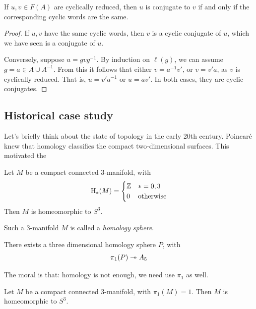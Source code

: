\documentclass{article}
\begin{document}
\begin{lemma}
     If \(u, v \in F(A)\) are cyclically reduced, then \(u\) is conjugate to \(v\) if and only if the corresponding cyclic words are the same.
\end{lemma}

\begin{proof}
    If \(u, v\) have the same cyclic words, then \(v\) is a cyclic conjugate of \(u\), which we have seen is a conjugate of \(u\).

    Conversely, suppose \(u = gvg^{-1}\). By induction on \(\ell(g)\), we can assume \(g = a \in A \cup A^{-1}\). From this it follows that either \(v = a^{-1}v'\), or \(v = v'a\), as \(v\) is cyclically reduced. That is, \(u = v'a^{-1}\) or \(u = av'\). In both cases, they are cyclic conjugates.
\end{proof}

\subsection{Historical case study}

Let's briefly think about the state of topology in the early 20th century. Poincar\'e knew that homology classifies the compact two-dimensional surfaces. This motivated the

\begin{conjecture}
     Let \(M\) be a compact connected 3-manifold, with
    \[\mathrm{H}_*(M) = \begin{cases}
        \mathbb{Z} & * = 0, 3 \\
        0 & \text{otherwise}
    \end{cases}\]
    Then \(M\) is homeomorphic to \(S^3\).
\end{conjecture}

Such a 3-manifold \(M\) is called a \emph{homology sphere}.

\begin{theorem}
    [Poincar\'e, 1904] There exists a three dimensional homology sphere \(P\), with
    \[\pi_1(P) \twoheadrightarrow A_5\]
\end{theorem}

The moral is that: homology is not enough, we need use \(\pi_1\) as well.

\begin{conjecture}
     Let \(M\) be a compact connected \(3\)-manifold, with \(\pi_1(M) = 1\). Then \(M\) is homeomorphic to \(S^3\).
\end{conjecture}
\end{document}
